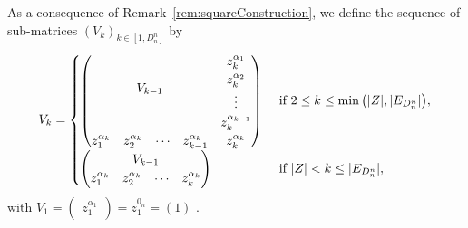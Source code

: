 \documentclass[11pt]{llncs}
\begin{document}
\begin{definition}\label{def:inductiveConstructionOfV}
    As a consequence of Remark~\ref{rem:squareConstruction}, we define the sequence of sub-matrices $\left(V_k\right)_{k\in [1,D_n^n]}$ by
    \begin{align*}
        V_k = 
        \begin{cases}
            \begin{pmatrix}
        \multicolumn{4}{c}{\multirow{4}{*}{$V_{k-1}$}} & z_k^{\alpha_{1}}\\
        & & & & z_k^{\alpha_{2}}\\
        & & & & \vdots\\
        & & & & z_k^{\alpha_{k-1}}\\
        z_1^{\alpha_{k}} & z_{2}^{\alpha_k}& \cdots & z_{k-1}^{\alpha_{k}} & z_{k}^{\alpha_{k}}
    \end{pmatrix} & \mbox{ if } 2\leq k \leq \min{\left(|Z|, |E_{D_n^n}|\right)},\\
    \begin{pmatrix}
        \multicolumn{4}{c}{\multirow{1}{*}{$V_{k-1}$}} \\
        z_1^{\alpha_k} & z_2^{\alpha_k} & \cdots & z_{k}^{\alpha_k}
    \end{pmatrix} & \mbox{ if } |Z| < k \leq |E_{D_n^n}|,
        \end{cases}
    \end{align*}
    with $V_1 = \begin{pmatrix} z_1^{\alpha_1}\end{pmatrix} = z_1^{0_n} = (1)$ .
\end{definition}
\end{document}
